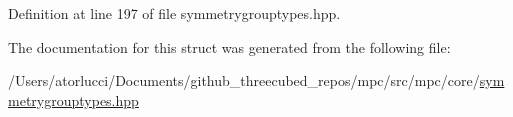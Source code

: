 Definition at line 197 of file symmetrygrouptypes.\+hpp.



The documentation for this struct was generated from the following file\+:\begin{DoxyCompactItemize}
\item 
/\+Users/atorlucci/\+Documents/github\+\_\+threecubed\+\_\+repos/mpc/src/mpc/core/\mbox{\hyperlink{symmetrygrouptypes_8hpp}{symmetrygrouptypes.\+hpp}}\end{DoxyCompactItemize}

